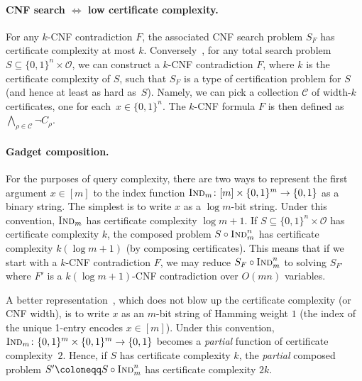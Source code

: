 \documentclass[11pt]{article}
\numberwithin{equation}{section}
\theoremstyle{definition}
\theoremstyle{plain}
\newcommand{\Ind}{\textsc{Ind}}
\newcommand{\calC}{\mathcal{C}}
\newcommand{\calO}{\mathcal{O}}
\newcommand{\bit}{\{0,1\}}
\begin{document}
\paragraph{CNF search $\Leftrightarrow$ low certificate complexity.}
For any $k$-CNF contradiction $F$, the associated CNF search problem $S_F$ has certificate complexity at most $k$. Conversely~\cite{lovasz95search}, for any total search problem $S\subseteq\{0,1\}^n\times\calO$, we can construct a $k$-CNF contradiction $F$, where $k$ is the certificate complexity of $S$, such that $S_F$ is a type of certification problem for $S$ (and hence at least as hard as~$S$). Namely, we can pick a collection $\calC$ of width-$k$ certificates, one for each~$x\in\{0,1\}^n$. The $k$-CNF formula $F$ is then defined as $\bigwedge_{\rho\in\calC} \neg C_\rho$.

\paragraph{Gadget composition.}
For the purposes of query complexity, there are two ways to represent the first argument $x\in[m]$ to the index function $\Ind_m\colon[m]\times\{0,1\}^m\to\bit$ as a binary string. The simplest is to write $x$ as a $\log m$-bit string. Under this convention, $\Ind_m$ has certificate complexity $\log m+1$. If $S\subseteq\{0,1\}^n\times\calO$ has certificate complexity $k$, the composed problem $S\circ \Ind_m^n$ has certificate complexity $k(\log m+1)$ (by composing certificates). This means that if we start with a $k$-CNF contradiction $F$, we may reduce $S_F\circ\Ind_m^n$ to solving $S_{F'}$ where $F'$ is a $k(\log m +1)$-CNF contradiction over $O(mn)$ variables.

A better representation~\cite{beame10hardness,rezende16limited}, which does not blow up the certificate complexity (or CNF width), is to write $x$ as an $m$-bit string of Hamming weight $1$ (the index of the unique 1-entry encodes $x\in[m]$). Under this convention, $\Ind_m\colon\{0,1\}^m\times\{0,1\}^m\to\{0,1\}$ becomes a \emph{partial} function of certificate complexity~$2$. Hence, if $S$ has certificate complexity $k$, the \emph{partial} composed problem $S'\coloneqq S\circ\Ind_m^n$ has certificate complexity $2k$.
\end{document}

